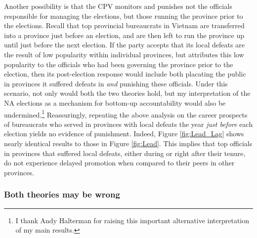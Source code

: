 \documentclass[12pt]{article}\usepackage[]{graphicx}\usepackage[]{color}
\newcommand{\1}{\mathbbm{1}}
\begin{document}
Another possibility is that the CPV monitors and punishes not the officials responsible for managing the elections, but those running the province prior to the elections. Recall that top provincial bureaucrats in Vietnam are transferred into a province just before an election, and are then left to run the province up until just before the next election. If the party accepts that its local defeats are the result of low popularity within individual provinces, but attributes this low popularity to the officials who had been governing the province prior to the election, then its post-election response would include both placating the public in provinces it suffered defeats in \textit{and} punishing these officials. Under this scenario, not only would both the two theories hold, but my interpretation of the NA elections as a mechanism for bottom-up accountability would also be undermined.\footnote{I thank Andy Halterman for raising this important alternative interpretation of my main results.} Reassuringly, repeating the above analysis on the career prospects of bureaucrats who served in provinces with local defeats the year \textit{just before} each election yields no evidence of punishment. Indeed, Figure \ref{fig:Lead_Lag} shows nearly identical results to those in Figure \ref{fig:Lead}. This implies that top officials in provinces that suffered local defeats, either during or right after their tenure, do not experience delayed promotion when compared to their peers in other provinces.


\subsubsection{Both theories may be wrong}
\end{document}
